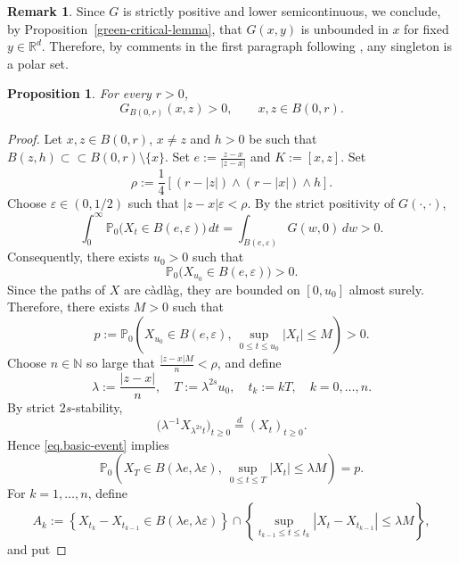 \documentclass[11pt,a4paper,reqno]{amsart}
\newtheorem{proposition}[theorem]{\bf Proposition}
\theoremstyle{definition}
\newtheorem{remark}[theorem]{Remark}
\numberwithin{equation}{section}
\begin{document}
\begin{remark}
\label{rem.polar}
Since  $G$ is strictly positive and lower semicontinuous, we conclude, by Proposition~\ref{green-critical-lemma}, that
$G(x,y)$ is unbounded in $x$ for fixed $y\in\mathbb R^d$.  
Therefore, by  comments in the first paragraph following \cite[Proposition VI.4.3]{BG},
any singleton is a polar set.  
\end{remark}



\begin{proposition}
\label{prop.spkg}
For every $r>0$,
\[
G_{B(0,r)}(x,z)>0,
\qquad x,z\in B(0,r).
\]
\end{proposition}

\begin{proof}
Let $x,z\in B(0,r)$, $x\neq z$ and $h>0$ be such that  $B(z,h)\subset\subset B(0,r)\setminus \{x\}$. Set 
$e:=\frac{z-x}{|z-x|}$ and  $K:=[x,z]$.
Set
\[
\rho:=\frac14[(r-|z|)\wedge (r-|x|)\wedge h].
\]
Choose $\varepsilon \in (0,1/2)$ such that $|z-x|\varepsilon<\rho$.
By the strict positivity of $G(\cdot,\cdot)$,
\[
\int_0^\infty
\mathbb{P}_0\bigl(X_t\in B(e,\varepsilon)\bigr)\,dt
=
\int_{B(e,\varepsilon)}G(w,0)\,dw>0.
\]
Consequently, there exists $u_0>0$ such that
\begin{equation}
\label{eq.endpoint-positive}
\mathbb{P}_0\bigl(X_{u_0}\in B(e,\varepsilon)\bigr)>0.
\end{equation}
Since the paths of $X$ are c\`adl\`ag, they are bounded on
$[0,u_0]$ almost surely. Therefore,
there exists $M>0$ such
that
\begin{equation}
\label{eq.basic-event}
p:=
\mathbb{P}_0\left(
X_{u_0}\in B(e,\varepsilon),\
\sup_{0\leq t\leq u_0}|X_t|\leq M
\right)>0.
\end{equation}
Choose $n\in\mathbb{N}$ so large that $\frac{|z-x|M}{n}<\rho$,
and define
\[
\lambda:=\frac{|z-x|}{n},\quad
T:=\lambda^{2s} u_0,
\quad
t_k:=kT,
\quad k=0,\ldots,n.
\]
By strict $2s$-stability,
\[
\bigl(\lambda^{-1}X_{\lambda^{2s} t}\bigr)_{t\geq0}
\overset{d}{=}
(X_t)_{t\geq0}.
\]
Hence \eqref{eq.basic-event} implies
\begin{equation}
\label{eq.scaled-event}
\mathbb{P}_0\left(
X_{T}\in B(\lambda e,\lambda\varepsilon),\
\sup_{0\leq t\leq T}|X_t|\leq\lambda M
\right)=p.
\end{equation}
For $k=1,\ldots,n$, define
\[
A_k:=
\left\{
X_{t_k}-X_{t_{k-1}}
   \in B(\lambda e,\lambda\varepsilon)
\right\}
\cap
\left\{
\sup_{t_{k-1}\leq t\leq t_k}
|X_t-X_{t_{k-1}}|
\leq\lambda M
\right\},
\]
and put

\end{proof}
\end{document}
